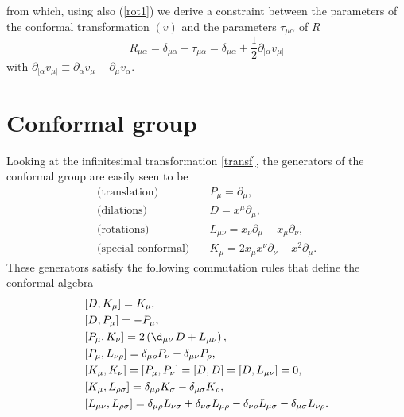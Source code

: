 \documentclass[a4paper,11pt,openright,twoside]{book}
\newcommand{\ro}{\rho}
\numberwithin{equation}{section}
\begin{document}
from which, using also (\ref{rot1}) we derive a constraint between the parameters of the conformal transformation $(v)$ and the parameters $\tau_{\mu\alpha}$ of $R$
\begin{equation}
	R_{\mu\alpha}= \delta_{\mu\alpha} + \tau_{\mu\alpha}=\delta_{\mu\alpha} + \frac{1}{2}\partial_{[\alpha }v_{\mu]}\label{Rrepr}
\end{equation}
with $ \partial_{[\alpha }v_{\mu]}\equiv
\partial_{\alpha }v_{\mu}-\partial_{\mu }v_{\alpha}$.\\
\section{Conformal group}
Looking at the infinitesimal transformation \eqref{transf}, the generators of the conformal group are easily seen to be
\begin{equation}
	\begin{aligned}
		\text{(translation)}\quad&P_\mu=\partial_\mu,\\
		\text{(dilations)}\quad&D=x^\mu\partial_\mu,\\
		\text{(rotations)}\quad&L_{\mu\nu}=x_\nu\partial_\mu-x_\mu\partial_\nu,\\
		\text{(special conformal)}\quad&K_{\mu}=2x_\mu x^\nu\partial_\nu-x^2\partial_\mu.
	\end{aligned}
\end{equation}
These generators satisfy the following commutation rules that define the conformal algebra
\begin{equation}
	\begin{split}
		&[D,K_\mu]=K_\mu,\\
		&[D,P_\mu]=-P_\mu,\\
		&[P_\mu,K_\nu]=2\left(\d_{\mu\nu}\,D+L_{\mu\nu}\right),\\
		&[P_\mu,L_{\nu\rho}]=\delta_{\mu\rho}P_{\nu}-\delta_{\mu\nu}P_{\rho},\\
		&[K_\mu,K_\nu]=[P_\mu,P_\nu]=[D,D]=[D,L_{\mu\nu}]=0,\\
		&[K_\mu,L_{\rho\sigma}]=\delta_{\mu\ro}K_\sigma-\delta_{\mu\sigma}K_\rho,\\
		&[L_{\mu\nu},L_{\rho\sigma}]=\delta_{\mu\rho}L_{\nu\sigma}+\delta_{\nu\sigma}L_{\mu\rho}-\delta_{\nu\rho}L_{\mu\sigma}-\delta_{\mu\sigma}L_{\nu\rho}.
	\end{split}
	\label{spec}
\end{equation}
\end{document}
